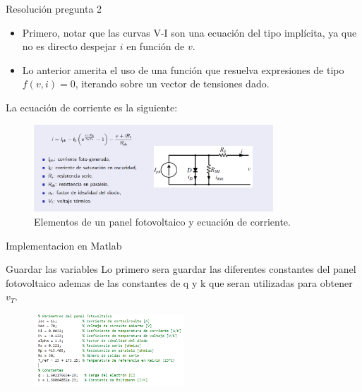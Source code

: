 \documentclass[
    10pt,
    aspectratio=169,
    xcolor={dvipsnames},
    spanish,
    ]{beamer}
\begin{document}
\begin{frame}
  \begin{block}{Resolución pregunta 2}
    \footnotesize 
      \begin{itemize}
        \item Primero, notar que las curvas V-I son una ecuación del tipo implícita, ya que no es directo despejar \( i \) en función de \( v \).
        \item Lo anterior amerita el uso de una función que resuelva expresiones de tipo \( f(v, i) = 0 \), iterando sobre un vector de tensiones dado.
      \end{itemize}
      La ecuación de corriente es la siguiente:
      \begin{figure}
        \centering
        \includegraphics[width=0.8\textwidth]{Figure_3.png}
        \caption{Elementos de un panel fotovoltaico y ecuación de corriente.}
      \end{figure}
  \end{block}
\end{frame}
\begin{frame}{Implementacion en Matlab}
  \begin{block}{Guardar las variables}
    Lo primero sera guardar las diferentes constantes del panel fotovoltaico ademas de las constantes de q y k que seran utilizadas para obtener $v_{T}$.
\begin{figure}
  \centering
  \includegraphics[width=0.5\textwidth]{Figure_4.png}
\end{figure}
\end{block}
\end{frame}
\end{document}
